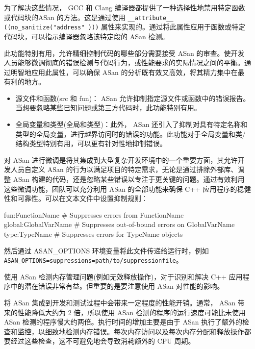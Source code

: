 为了解决这些情况， GCC 和 Clang 编译器都提供了一种选择性地禁用特定函数或代码块的ASan 的方法。这是通过使用 \verb|__attribute__ ((no_sanitize("address" )))| 属性来实现的。通过将此属性应用于函数或特定代码块，可以指示编译器忽略该特定段的 ASan 检测。

此功能特别有用，允许精细控制代码的哪些部分需要接受 ASan 的审查。使开发人员能够微调彻底的错误检测与代码行为，或性能要求的实际情况之间的平衡。通过明智地应用此属性，可以确保 ASan 的分析既有效又高效，将其精力集中在最有利的地方。


\begin{itemize}
\item
源文件和函数(src 和 fun)： ASan 允许抑制指定源文件或函数中的错误报告。当想要忽略某些已知问题或第三方代码时，此功能特别有用。

\item
全局变量和类型(全局和类型)：此外， ASan 还引入了抑制对具有特定名称和类型的全局变量，进行越界访问时的错误的功能。此功能对于全局变量和类/结构类型特别有用，可以更有针对性地抑制错误。
\end{itemize}


对 ASan 进行微调是将其集成到大型复杂开发环境中的一个重要方面，其允许开发人员自定义 ASan 的行为以满足项目的特定需求，无论是通过排除外部库、调整 ASan 构建的代码，还是忽略某些错误以专注于更关键的问题。通过有效利用这些微调功能，团队可以充分利用 ASan 的全部功能来确保 C++ 应用程序的稳健性和可靠性。可以在文本文件中设置抑制规则：

\begin{shell}
fun:FunctionName # Suppresses errors from FunctionName
global:GlobalVarName # Suppresses out-of-bound errors on GlobalVarName
type:TypeName # Suppresses errors for TypeName objects
\end{shell}

然后通过 ASAN\_OPTIONS 环境变量将此文件传递给运行时，例如 \verb|ASAN_OPTIONS=suppressions=path/to/suppressionfile|。


使用 ASan 检测内存管理问题(例如无效释放操作)，对于识别和解决 C++ 应用程序中的潜在错误非常有益。但重要的是要注意使用 ASan 对性能的影响。


将 ASan 集成到开发和测试过程中会带来一定程度的性能开销。通常， ASan 带来的性能降低大约为 2 倍，所以使用 ASan 检测的程序的运行速度可能比未使用 ASan 检测的程序慢大约两倍。执行时间的增加主要是由于 ASan 执行了额外的检查和监控，以细致地检测内存错误。每次内存访问以及每次内存分配和释放操作都要经过这些检查，这不可避免地会导致消耗额外的 CPU 周期。

